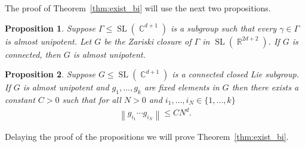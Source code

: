 \documentclass[12pt]{amsart}
\theoremstyle{plain}
\newtheorem{proposition}{Proposition}[section]
\theoremstyle{definition}
\theoremstyle{remark}
\begin{document}
The proof of Theorem~\ref{thm:exist_bi} will use the next two propositions.

\begin{proposition}
\label{prop:Ugp}
Suppose $\Gamma \leq \operatorname{SL}(\operatorname{\mathbb{C}}^{d+1})$ is a subgroup such that every $\gamma \in \Gamma$ is almost unipotent. Let $G$ be the Zariski closure of $\Gamma$ in $\operatorname{SL}(\operatorname{\mathbb{R}}^{2d+2})$. If $G$ is connected, then $G$ is almost unipotent.
\end{proposition}

\begin{proposition}
\label{prop:growth}
Suppose $G \leq \operatorname{SL}(\operatorname{\mathbb{C}}^{d+1})$ is a connected closed Lie subgroup. If $G$ is almost unipotent and $g_1, \dots, g_k$ are fixed elements in $G$ then there exists a constant $C>0$ such that for all $N>0$ and $i_1, \dots, i_N \in \{1,\dots,k\}$
\begin{align*}
{\left\|{g_{i_1} \cdots g_{i_N}}\right\|} \leq CN^d.
\end{align*}
\end{proposition}

Delaying the proof of the propositions we will prove Theorem~\ref{thm:exist_bi}.
\end{document}
